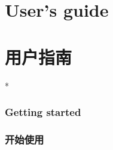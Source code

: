 \begin{paracol}{2}
\part{User's guide}
\switchcolumn
\part{用户指南}
\switchcolumn[0]*%
\section{Getting started}\label{uGettingStarted}
\switchcolumn
\section{开始使用}
\end{paracol}